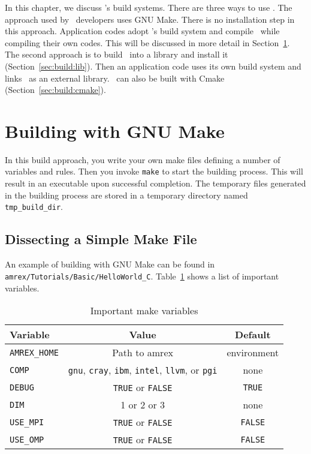 
In this chapter, we discuss \amrex's build systems.  There are three
ways to use \amrex.  The approach used by \amrex\ developers uses GNU
Make.  There is no installation step in this approach.  Application
codes adopt \amrex's build system and compile \amrex\ while compiling
their own codes.  This will be discussed in more detail in
Section~\ref{sec:build:make}.  The second approach is to build \amrex\
into a library and install it (Section~\ref{sec:build:lib}).  Then an
application code uses its own build system and links \amrex\ as an
external library.  \amrex\ can also be built with Cmake
(Section~\ref{sec:build:cmake}).

\section{Building with GNU Make}
\label{sec:build:make}

In this build approach, you write your own make files defining a
number of variables and rules.  Then you invoke {\tt make} to start
the building process.  This will result in an executable upon
successful completion.  The temporary files generated in the building
process are stored in a temporary directory named {\tt
  tmp\_build\_dir}.

\subsection{Dissecting a Simple Make File}

An example of building with GNU Make can be found in {\tt
  amrex/Tutorials/Basic/HelloWorld\_C}.  Table~\ref{tab:makevarimp}
shows a list of important variables.
\begin{table}[t]
  \centering
  \begin{tabular}{lcc}
    Variable & Value & Default \\
    \hline
    {\tt AMREX\_HOME} & Path to amrex & environment \\
    {\tt COMP} & {\tt gnu}, {\tt cray}, {\tt ibm}, {\tt intel}, {\tt llvm}, or {\tt pgi} & none \\
    {\tt DEBUG} & {\tt TRUE} or {\tt FALSE} & {\tt TRUE} \\
    {\tt DIM} & 1 or 2 or 3 & none \\
    {\tt USE\_MPI} & {\tt TRUE} or {\tt FALSE} & {\tt FALSE} \\
    {\tt USE\_OMP} & {\tt TRUE} or {\tt FALSE} & {\tt FALSE} \\
    \hline
  \end{tabular}
  \caption{\label{tab:makevarimp} Important make variables}
\end{table}

